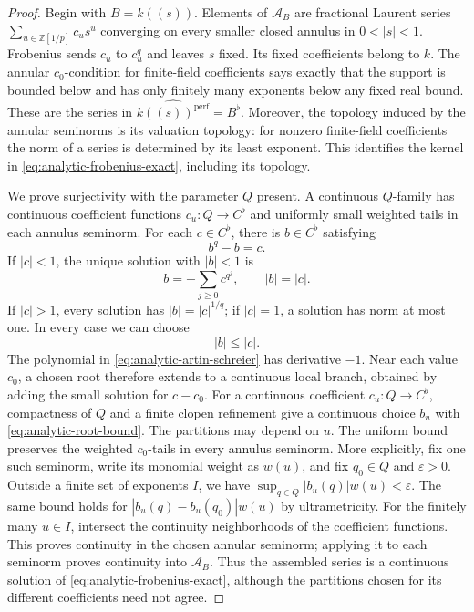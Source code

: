 \begin{proof}
Begin with \(B=k((s))\).  Elements of \(\mathcal A_B\) are
fractional Laurent series
\(\sum_{u\in\mathbb Z[1/p]}c_u s^u\) converging on every smaller
closed annulus in \(0<|s|<1\).
Frobenius sends \(c_u\) to \(c_u^q\) and leaves \(s\) fixed.
Its fixed coefficients belong to \(k\).
The annular \(c_0\)-condition for finite-field coefficients says
exactly that the support is bounded below and has only finitely
many exponents below any fixed real bound.  These are the series
in \(\widehat{k((s))^{\mathrm{perf}}}=B^\flat\).
Moreover, the topology induced by the annular seminorms is its
valuation topology: for nonzero finite-field coefficients the
norm of a series is determined by its least exponent.  This
identifies the kernel in \eqref{eq:analytic-frobenius-exact},
including its topology.

We prove surjectivity with the parameter \(Q\) present.
A continuous \(Q\)-family has continuous coefficient functions
\(c_u:Q\to C^\flat\) and uniformly small weighted tails in each
annulus seminorm.  For each \(c\in C^\flat\), there is \(b\in C^\flat\)
satisfying
\begin{equation}
 b^q-b=c.
 \label{eq:analytic-artin-schreier}
\end{equation}
If \(|c|<1\), the unique solution with \(|b|<1\)
is
\[
 b=-\sum_{j\geq0}c^{q^j},\qquad |b|=|c|.
\]
If \(|c|>1\), every solution has
\(|b|=|c|^{1/q}\); if \(|c|=1\), a solution has norm at most one.
In every case we can choose
\begin{equation}
 |b|\leq |c|.
 \label{eq:analytic-root-bound}
\end{equation}
The polynomial in \eqref{eq:analytic-artin-schreier} has derivative
\(-1\).  Near each value \(c_0\), a chosen root therefore extends
to a continuous local branch, obtained by adding the small
solution for \(c-c_0\).
For a continuous coefficient \(c_u:Q\to C^\flat\), compactness of
\(Q\) and a finite clopen refinement give a continuous choice
\(b_u\) with \eqref{eq:analytic-root-bound}.
The partitions may depend on \(u\).
The uniform bound preserves the weighted \(c_0\)-tails in every
annulus seminorm.  More explicitly, fix one such seminorm, write
its monomial weight as \(w(u)\), and fix \(q_0\in Q\) and
\(\varepsilon>0\).  Outside a finite set of exponents \(I\),
we have \(\sup_{q\in Q}|b_u(q)|w(u)<\varepsilon\).
The same bound holds for
\(|b_u(q)-b_u(q_0)|w(u)\) by ultrametricity.  For the finitely
many \(u\in I\), intersect the continuity neighborhoods of
the coefficient functions.  This proves continuity in the
chosen annular seminorm; applying it to each seminorm proves
continuity into \(\mathcal A_B\).  Thus the assembled series
is a continuous solution of
\eqref{eq:analytic-frobenius-exact}, although the partitions
chosen for its different coefficients need not agree.


\end{proof}
